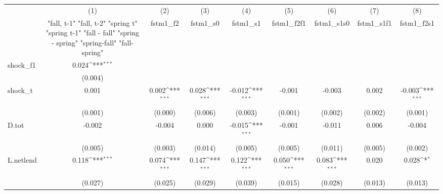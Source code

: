{
\def\sym#1{\ifmmode^{#1}\else\(^{#1}\)\fi}
\begin{tabular}{l*{8}{c}}
\toprule
            &\multicolumn{1}{c}{(1)}&\multicolumn{1}{c}{(2)}&\multicolumn{1}{c}{(3)}&\multicolumn{1}{c}{(4)}&\multicolumn{1}{c}{(5)}&\multicolumn{1}{c}{(6)}&\multicolumn{1}{c}{(7)}&\multicolumn{1}{c}{(8)}\\
            &\multicolumn{1}{c}{  "fall, t-1" "fall, t-2" "spring t" "spring t-1"  "fall - fall" "spring - spring" "spring-fall" "fall-spring" }&\multicolumn{1}{c}{fstm1\_f2}&\multicolumn{1}{c}{fstm1\_s0}&\multicolumn{1}{c}{fstm1\_s1}&\multicolumn{1}{c}{fstm1\_f2f1}&\multicolumn{1}{c}{fstm1\_s1s0}&\multicolumn{1}{c}{fstm1\_s1f1}&\multicolumn{1}{c}{fstm1\_f2s1}\\
\midrule
shock\_f1    &       0.024\sym{***}&                     &                     &                     &                     &                     &                     &                     \\
            &     (0.004)         &                     &                     &                     &                     &                     &                     &                     \\
\addlinespace
shock\_t     &       0.001         &       0.002\sym{***}&       0.028\sym{***}&      -0.012\sym{***}&      -0.001         &      -0.003         &       0.002         &      -0.003\sym{***}\\
            &     (0.001)         &     (0.000)         &     (0.006)         &     (0.003)         &     (0.001)         &     (0.002)         &     (0.002)         &     (0.001)         \\
\addlinespace
D.tot       &      -0.002         &      -0.004         &       0.000         &      -0.015\sym{***}&      -0.001         &      -0.011         &       0.006         &      -0.004         \\
            &     (0.005)         &     (0.003)         &     (0.014)         &     (0.005)         &     (0.005)         &     (0.011)         &     (0.005)         &     (0.002)         \\
\addlinespace
L.netlend   &       0.118\sym{***}&       0.074\sym{***}&       0.147\sym{***}&       0.122\sym{***}&       0.050\sym{***}&       0.083\sym{***}&       0.020         &       0.028\sym{*}  \\
            &     (0.027)         &     (0.025)         &     (0.029)         &     (0.039)         &     (0.015)         &     (0.028)         &     (0.013)         &     (0.013)         \\

\end{tabular}}

